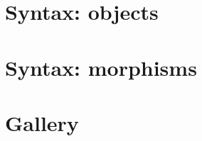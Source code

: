 


\newpage
\section{Syntax: objects}

% 


\newpage
\section{Syntax: morphisms}

% 


\newpage
\section{Gallery}

% 


